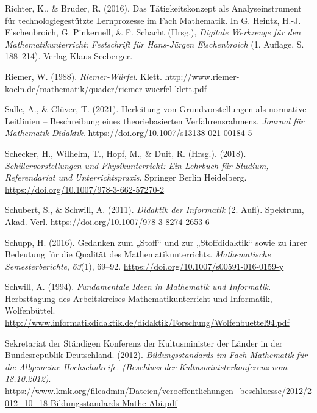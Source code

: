 \documentclass[
]{scrbook}
\newlength{\cslhangindent}
\newenvironment{CSLReferences}[2] %
 {\begin{list}{}{%
  \setlength{\itemindent}{0pt}
  \setlength{\leftmargin}{0pt}
  \setlength{\parsep}{0pt}
  \ifodd #1
   \setlength{\leftmargin}{\cslhangindent}
   \setlength{\itemindent}{-1\cslhangindent}
  \fi
  \setlength{\itemsep}{#2\baselineskip}}}
 {\end{list}}
\theoremstyle{definition}
\theoremstyle{definition}
\theoremstyle{definition}
\theoremstyle{definition}
\theoremstyle{remark}
\begin{document}
\begin{CSLReferences}{1}{0}
Richter, K., \& Bruder, R. (2016). Das {Tätigkeitskonzept} als {Analyseinstrument} für technologiegestützte {Lernprozesse} im {Fach} {Mathematik}. In G. Heintz, H.-J. Elschenbroich, G. Pinkernell, \& F. Schacht (Hrsg.), \emph{Digitale {Werkzeuge} für den {Mathematikunterricht}: {Festschrift} für {Hans}-{Jürgen} {Elschenbroich}} (1. Auflage, S. 188--214). Verlag Klaus Seeberger.

Riemer, W. (1988). \emph{Riemer-{Würfel}}. Klett. \url{http://www.riemer-koeln.de/mathematik/quader/riemer-wuerfel-klett.pdf}

Salle, A., \& Clüver, T. (2021). Herleitung von {Grundvorstellungen} als normative {Leitlinien} -- {Beschreibung} eines theoriebasierten {Verfahrensrahmens}. \emph{Journal für Mathematik-Didaktik}. \url{https://doi.org/10.1007/s13138-021-00184-5}

Schecker, H., Wilhelm, T., Hopf, M., \& Duit, R. (Hrsg.). (2018). \emph{Schülervorstellungen und {Physikunterricht}: {Ein} {Lehrbuch} für {Studium}, {Referendariat} und {Unterrichtspraxis}}. Springer Berlin Heidelberg. \url{https://doi.org/10.1007/978-3-662-57270-2}

Schubert, S., \& Schwill, A. (2011). \emph{Didaktik der {Informatik}} (2. Aufl). Spektrum, Akad. Verl. \url{https://doi.org/10.1007/978-3-8274-2653-6}

Schupp, H. (2016). Gedanken zum „{Stoff}`` und zur „{Stoffdidaktik}`` sowie zu ihrer {Bedeutung} für die {Qualität} des {Mathematikunterrichts}. \emph{Mathematische Semesterberichte}, \emph{63}(1), 69--92. \url{https://doi.org/10.1007/s00591-016-0159-y}

Schwill, A. (1994). \emph{Fundamentale {Ideen} in {Mathematik} und {Informatik}}. Herbsttagung des Arbeitskreises Mathematikunterricht und Informatik, Wolfenbüttel. \url{http://www.informatikdidaktik.de/didaktik/Forschung/Wolfenbuettel94.pdf}

Sekretariat der Ständigen Konferenz der Kultusminister der Länder in der Bundesrepublik Deutschland. (2012). \emph{Bildungsstandards im {Fach} {Mathematik} für die {Allgemeine} {Hochschulreife}. (Beschluss der Kultusministerkonferenz vom 18.10.2012)}. \url{https://www.kmk.org/fileadmin/Dateien/veroeffentlichungen_beschluesse/2012/2012_10_18-Bildungsstandards-Mathe-Abi.pdf}


\end{CSLReferences}
\end{document}
